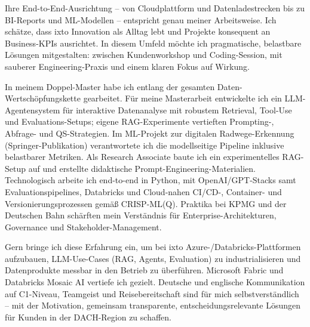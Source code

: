 Ihre End-to-End-Ausrichtung – von Cloudplattform und Datenladestrecken bis zu BI-Reports und ML-Modellen – entspricht genau meiner Arbeitsweise. Ich schätze, dass ixto Innovation als Alltag lebt und Projekte konsequent an Business-KPIs ausrichtet. In diesem Umfeld möchte ich pragmatische, belastbare Lösungen mitgestalten: zwischen Kundenworkshop und Coding-Session, mit sauberer Engineering-Praxis und einem klaren Fokus auf Wirkung.

In meinem Doppel-Master habe ich entlang der gesamten Daten-Wertschöpfungskette gearbeitet. Für meine Masterarbeit entwickelte ich ein LLM-Agentensystem für interaktive Datenanalyse mit robustem Retrieval, Tool-Use und Evaluations-Setups; eigene RAG-Experimente vertieften Prompting-, Abfrage- und QS-Strategien. Im ML-Projekt zur digitalen Radwege-Erkennung (Springer-Publikation) verantwortete ich die modellseitige Pipeline inklusive belastbarer Metriken. Als Research Associate baute ich ein experimentelles RAG-Setup auf und erstellte didaktische Prompt-Engineering-Materialien. Technologisch arbeite ich end-to-end in Python, mit OpenAI/GPT-Stacks samt Evaluationspipelines, Databricks und Cloud-nahen CI/CD-, Container- und Versionierungsprozessen gemäß CRISP-ML(Q). Praktika bei KPMG und der Deutschen Bahn schärften mein Verständnis für Enterprise-Architekturen, Governance und Stakeholder-Management.

Gern bringe ich diese Erfahrung ein, um bei ixto Azure-/Databricks-Plattformen aufzubauen, LLM-Use-Cases (RAG, Agents, Evaluation) zu industrialisieren und Datenprodukte messbar in den Betrieb zu überführen. Microsoft Fabric und Databricks Mosaic AI vertiefe ich gezielt. Deutsche und englische Kommunikation auf C1-Niveau, Teamgeist und Reisebereitschaft sind für mich selbstverständlich – mit der Motivation, gemeinsam transparente, entscheidungsrelevante Lösungen für Kunden in der DACH-Region zu schaffen.